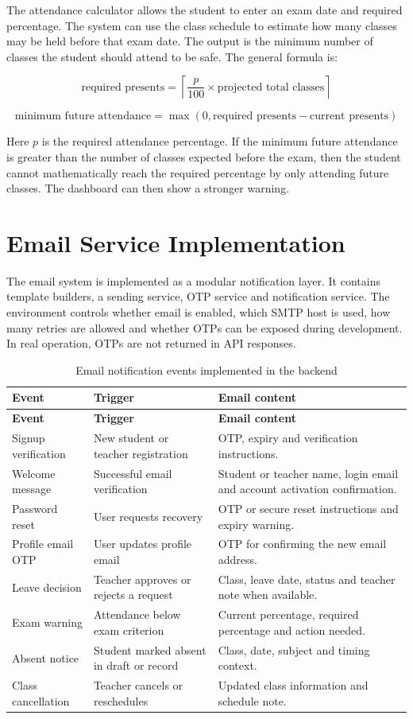 The attendance calculator allows the student to enter an exam date and required percentage. The system can use the class schedule to estimate how many classes may be held before that exam date. The output is the minimum number of classes the student should attend to be safe. The general formula is:

\[
\text{required presents} = \left\lceil \frac{p}{100} \times \text{projected total classes} \right\rceil
\]

\[
\text{minimum future attendance} = \max(0, \text{required presents} - \text{current presents})
\]

Here \(p\) is the required attendance percentage. If the minimum future attendance is greater than the number of classes expected before the exam, then the student cannot mathematically reach the required percentage by only attending future classes. The dashboard can then show a stronger warning.

\section{Email Service Implementation}

The email system is implemented as a modular notification layer. It contains template builders, a sending service, OTP service and notification service. The environment controls whether email is enabled, which SMTP host is used, how many retries are allowed and whether OTPs can be exposed during development. In real operation, OTPs are not returned in API responses.

\begin{longtable}{p{3.2cm} p{4.2cm} p{6cm}}
\caption{Email notification events implemented in the backend}
\label{tab:email-events-implementation}\\
\toprule
\textbf{Event} & \textbf{Trigger} & \textbf{Email content}\\
\midrule
\endfirsthead
\toprule
\textbf{Event} & \textbf{Trigger} & \textbf{Email content}\\
\midrule
\endhead
Signup verification & New student or teacher registration & OTP, expiry and verification instructions.\\
Welcome message & Successful email verification & Student or teacher name, login email and account activation confirmation.\\
Password reset & User requests recovery & OTP or secure reset instructions and expiry warning.\\
Profile email OTP & User updates profile email & OTP for confirming the new email address.\\
Leave decision & Teacher approves or rejects a request & Class, leave date, status and teacher note when available.\\
Exam warning & Attendance below exam criterion & Current percentage, required percentage and action needed.\\
Absent notice & Student marked absent in draft or record & Class, date, subject and timing context.\\
Class cancellation & Teacher cancels or reschedules & Updated class information and schedule note.\\
\bottomrule
\end{longtable}

